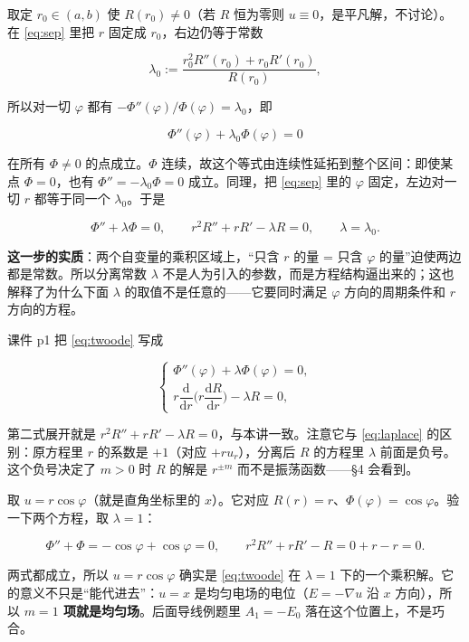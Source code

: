 \documentclass[11pt]{ctexart}
\let\origsubhdr\subhdr
\renewcommand{\subhdr}[1]{\par\needspace{3\baselineskip}\origsubhdr{#1}}
\begin{document}
取定 $r_0\in(a,b)$ 使 $R(r_0)\ne0$（若 $R$ 恒为零则 $u\equiv0$，是平凡解，不讨论）。在 \eqref{eq:sep} 里把 $r$ 固定成 $r_0$，右边仍等于常数

\[
\lambda_0:=\frac{r_0^2R''(r_0)+r_0R'(r_0)}{R(r_0)},
\]

所以对一切 $\varphi$ 都有 $-\Phi''(\varphi)/\Phi(\varphi)=\lambda_0$，即

\[
\Phi''(\varphi)+\lambda_0\Phi(\varphi)=0
\]

在所有 $\Phi\ne0$ 的点成立。$\Phi$ 连续，故这个等式由连续性延拓到整个区间：即使某点 $\Phi=0$，也有 $\Phi''=-\lambda_0\Phi=0$ 成立。同理，把 \eqref{eq:sep} 里的 $\varphi$ 固定，左边对一切 $r$ 都等于同一个 $\lambda_0$。于是

\begin{equation}
\Phi''+\lambda\Phi=0,
\qquad
r^2R''+rR'-\lambda R=0,
\qquad \lambda=\lambda_0 .
\label{eq:twoode}
\end{equation}

\textbf{这一步的实质}：两个自变量的乘积区域上，“只含 $r$ 的量 = 只含 $\varphi$ 的量”迫使两边都是常数。所以分离常数 $\lambda$ 不是人为引入的参数，而是方程结构逼出来的；这也解释了为什么下面 $\lambda$ 的取值不是任意的——它要同时满足 $\varphi$ 方向的周期条件和 $r$ 方向的方程。


课件 p1 把 \eqref{eq:twoode} 写成

\[
\begin{cases}
\Phi''(\varphi)+\lambda\Phi(\varphi)=0,\\[2pt]
r\dfrac{\mathrm d}{\mathrm dr}\Big(r\dfrac{\mathrm dR}{\mathrm dr}\Big)-\lambda R=0,
\end{cases}
\]

第二式展开就是 $r^2R''+rR'-\lambda R=0$，与本讲一致。注意它与 \eqref{eq:laplace} 的区别：原方程里 $r$ 的系数是 $+1$（对应 $+ru_r$），分离后 $R$ 的方程里 $\lambda$ 前面是负号。这个负号决定了 $m>0$ 时 $R$ 的解是 $r^{\pm m}$ 而不是振荡函数——\S4 会看到。


取 $u=r\cos\varphi$（就是直角坐标里的 $x$）。它对应 $R(r)=r$、$\Phi(\varphi)=\cos\varphi$。验一下两个方程，取 $\lambda=1$：

\[
\Phi''+\Phi=-\cos\varphi+\cos\varphi=0,\qquad
r^2R''+rR'-R=0+r-r=0 .
\]

两式都成立，所以 $u=r\cos\varphi$ 确实是 \eqref{eq:twoode} 在 $\lambda=1$ 下的一个乘积解。它的意义不只是“能代进去”：$u=x$ 是均匀电场的电位（$E=-\nabla u$ 沿 $x$ 方向），所以 \textbf{$m=1$ 项就是均匀场}。后面导线例题里 $A_1=-E_0$ 落在这个位置上，不是巧合。
\end{document}

